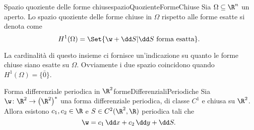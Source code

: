 \begin{defn}{Spazio quoziente delle forme chiuse}{spazioQuozienteFormeChiuse}
	Sia \(\Omega\subseteq \R^n\) un aperto.
	Lo spazio quoziente delle forme chiuse in \(\Omega\) rispetto alle forme esatte si denota come
	\[
		H^1 (\Omega) = \Set{\w + \dd S | \dd S \text{ forma esatta}}.
	\]
\end{defn}

\begin{oss}
	La cardinalità di questo insieme ci fornisce un'indicazione su quanto le forme chiuse siano esatte su \(\Omega\).
	Ovviamente i due spazio coincidono quando \(H^1(\Omega) = \{\bar{0}\}\).
\end{oss}

\begin{prop}{Forma differenziale periodica in \(\R^2\)}{formeDifferenzialiPeriodiche}
	Sia \(\w\colon \R^2 \to \big(\R^2\big)^*\) una forma differenziale periodica, di classe \(C^1\) e chiusa su \(\R^2\).
	Allora esistono \(c_1,c_2\in \R\) e \(S\in C^2(\R^2,\R)\) periodica tali che
	\[
		\w = c_1\,\dd x + c_2\,\dd y + \dd S.
	\]
\end{prop}

